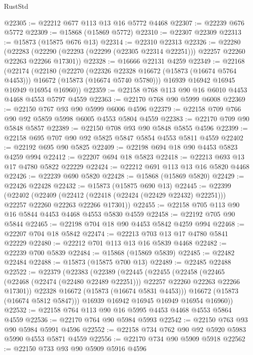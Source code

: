 \begin{lexlean}{RustStd}
\begin{coremodule}
@22305 := @22212 @677 @113 @13 @16 @5772 @4468
@22307 := @22239 @676 @5772
@22309 := @15868 (@15869 @5772)
@22310 := @22307 @22309
@22313 := @15873 (@15875 @676 @13)
@22314 := @22310 @22313
@22326 := @22280
    (@22283 (@22290 (@22293 (@22299 (@22305 @22314 @22251))) @22257 @22260 @22263 @22266 @17301))
@22328 := @16666 @22131 @4259
@22349 := @22168
    (@22174
      (@22180
        (@22270
          (@22326 @22328 @16672 (@15873 (@16674 @5764 @4453)))
          @16672
          (@15873 (@16674 @5740 @5780)))
        @16939
        @16942
        @16945
        @16949
        @16954
        @16960))
@22359 := @22158 @768 @113 @90 @16 @6010 @4453 @4468 @4553 @5797 @4559
@22363 := @22170 @768 @90 @5999 @6008
@22369 := @22150 @767 @93 @90 @5999 @6006 @4596
@22379 := @22158 @709 @766 @90 @92 @5859 @5998 @6005 @4553 @5804 @4559
@22383 := @22170 @709 @90 @5848 @5857
@22389 := @22150 @708 @93 @90 @5848 @5855 @4596
@22399 := @22158 @695 @707 @90 @92 @5825 @5847 @5854 @4553 @5811 @4559
@22402 := @22192 @695 @90 @5825
@22409 := @22198 @694 @18 @90 @4453 @5823 @4259 @994
@22412 := @22207 @694 @18 @5823
@22418 := @22213 @693 @13 @17 @4780 @5822 @22229
@22424 := @22212 @691 @113 @13 @16 @5820 @4468
@22426 := @22239 @690 @5820
@22428 := @15868 (@15869 @5820)
@22429 := @22426 @22428
@22432 := @15873 (@15875 @690 @13)
@22445 := @22399
    (@22402
      (@22409 (@22412 (@22418 (@22424 (@22429 @22432) @22251))) @22257 @22260 @22263 @22266 @17301))
@22455 := @22158 @705 @113 @90 @16 @5844 @4453 @4468 @4553 @5830 @4559
@22458 := @22192 @705 @90 @5844
@22465 := @22198 @704 @18 @90 @4453 @5842 @4259 @994
@22468 := @22207 @704 @18 @5842
@22474 := @22213 @703 @13 @17 @4780 @5841 @22229
@22480 := @22212 @701 @113 @13 @16 @5839 @4468
@22482 := @22239 @700 @5839
@22484 := @15868 (@15869 @5839)
@22485 := @22482 @22484
@22488 := @15873 (@15875 @700 @13)
@22489 := @22485 @22488
@22522 := @22379
    (@22383
      (@22389
        (@22445
          (@22455
            (@22458
              (@22465 (@22468 (@22474 (@22480 @22489 @22251))) @22257 @22260 @22263 @22266 @17301))
            @22328
            @16672
            (@15873 (@16674 @5831 @4453)))
          @16672
          (@15873 (@16674 @5812 @5847)))
        @16939
        @16942
        @16945
        @16949
        @16954
        @16960))
@22532 := @22158 @764 @113 @90 @16 @5995 @4453 @4468 @4553 @5864 @4559
@22536 := @22170 @764 @90 @5984 @5993
@22542 := @22150 @763 @93 @90 @5984 @5991 @4596
@22552 := @22158 @734 @762 @90 @92 @5920 @5983 @5990 @4553 @5871 @4559
@22556 := @22170 @734 @90 @5909 @5918
@22562 := @22150 @733 @93 @90 @5909 @5916 @4596

\end{coremodule}
\end{lexlean}
